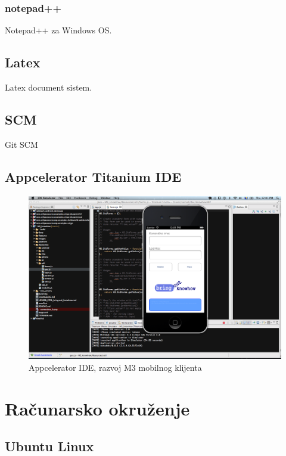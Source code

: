 \documentclass[times, utf8, seminar]{fit}
\begin{document}
\subsection{notepad++}

Notepad++ za Windows OS.

\section{Latex}

Latex document sistem.

\section{SCM}

Git SCM

\section{Appcelerator Titanium IDE}

\begin{figure}[H]
\centering
\includegraphics[width=14cm]{img/titanium_m3.png}
\caption{Appcelerator IDE, razvoj M3 mobilnog klijenta}
\end{figure}


\chapter{Računarsko okruženje}

\section{Ubuntu Linux}
\end{document}
